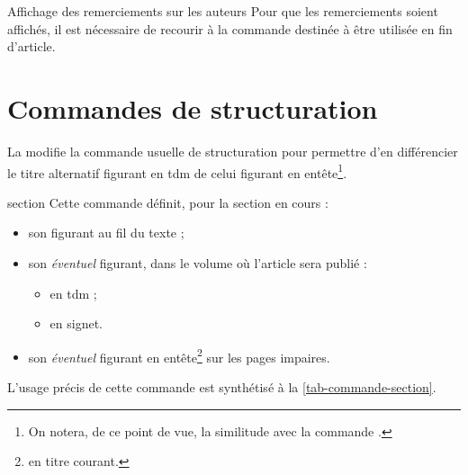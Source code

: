 \documentclass[french,nolocaltoc]{nwejmart}
\newtheorem[style=definition]{fait}
\newtheorem[title=contraventionnalisation]{ctrv}
\newtheorem[title-plural=anneaux]{anneau}
\newtheorem[title-plural=idéaux]{idéal}
\begin{document}
\begin{bodycode}[listing options={deletekeywords={[2]first}}]
\end{bodycode}

\begin{dbremark}{Affichage des remerciements sur les auteurs}{}
  Pour que les remerciements soient affichés, il est nécessaire de recourir à la
  commande  destinée à être utilisée en fin d'article.
\end{dbremark}

\section{Commandes de structuration}

La \nwejmauthorcl{} modifie la commande usuelle de structuration
 pour permettre d'en différencier le titre alternatif
figurant en \gls{tdm} de celui figurant en entête\footnote{On notera, de ce
  point de vue, la similitude avec la commande \protect{}.}.

\begin{docCommand}[doc new=2017-10-23]{section}{}
  Cette commande définit, pour la section en cours :
  \begin{itemize}
  \item son  figurant au fil du texte ;
  \item son \emph{éventuel}  figurant, dans le volume où
    l'article sera publié :
    \begin{itemize}
    \item en \gls{tdm} ;
    \item en signet.
    \end{itemize}
  \item son \emph{éventuel}  figurant en
    entête\footnote{\Ie{} en titre courant.} sur les pages impaires.
  \end{itemize}
  L'usage précis de cette commande est synthétisé à la
  \vref{tab-commande-section}.
\end{docCommand}
\end{document}
